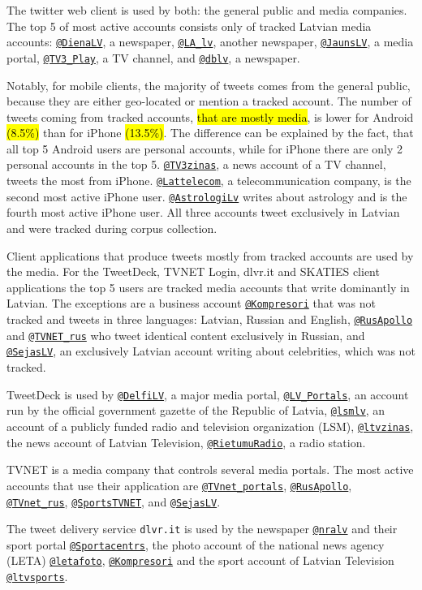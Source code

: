 \documentclass{IOS-Book-Article}
\makeatletter
\newcommand{\sn}[1]{\href{https://twitter.com/#1}{\texttt{@#1}}}
\makeatother
\begin{document}
The twitter web client is used by both: the general public and media companies. The top 5 of most active accounts consists only of tracked Latvian media accounts: \sn{DienaLV}, a newspaper, \sn{LA\_lv}, another newspaper, \sn{JaunsLV}, a media portal, \sn{TV3\_Play}, a TV channel, and \sn{dblv}, a newspaper.


Notably, for mobile clients, the majority of tweets comes from the general public, because they are either geo-located or mention a tracked account. The number of tweets coming from tracked accounts, \hl{that are mostly media}, is lower for Android \hl{(8.5\%)} than for iPhone \hl{(13.5\%)}. The difference can be explained by the fact, that all top 5 Android users are personal accounts, while for iPhone there are only 2 personal accounts in the top 5. \sn{TV3zinas}, a news account of a TV channel, tweets the most from iPhone. \sn{Lattelecom}, a telecommunication company, is the second most active iPhone user. \sn{AstrologiLv} writes about astrology and is the fourth most active iPhone user. All three accounts tweet exclusively in Latvian and were tracked during corpus collection.

Client applications that produce tweets mostly from tracked accounts are used by the media. For the TweetDeck, TVNET Login, dlvr.it and SKATIES client applications the top 5 users are tracked media accounts that write dominantly in Latvian. The exceptions are a business account \sn{Kompresori} that was not tracked and tweets in three languages: Latvian, Russian and English, \sn{RusApollo} and \sn{TVNET\_rus} who tweet identical content exclusively in Russian, and \sn{SejasLV}, an exclusively Latvian account writing about celebrities, which was not tracked.

TweetDeck is used by \sn{DelfiLV}, a major media portal, \sn{LV\_Portals}, an account run by the official government gazette of the Republic of Latvia, \sn{lsmlv}, an account of a publicly funded radio and television organization (LSM), \sn{ltvzinas}, the news account of Latvian Television, \sn{RietumuRadio}, a radio station. 

TVNET is a media company that controls several media portals. The most active accounts that use their application are \sn{TVnet\_portals}, \sn{RusApollo}, \sn{TVnet\_rus}, \sn{SportsTVNET}, and \sn{SejasLV}.

The tweet delivery service \texttt{dlvr.it} is used by the newspaper \sn{nralv} and their sport portal \sn{Sportacentrs}, the photo account of the national news agency (LETA) \sn{letafoto}, \sn{Kompresori} and the sport account of Latvian Television \sn{ltvsports}.
\end{document}
